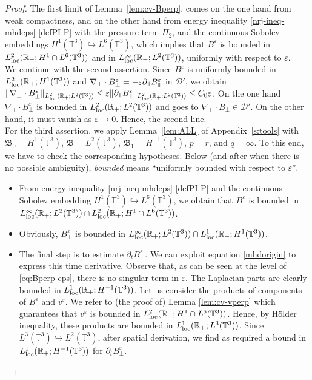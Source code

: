 \documentclass[11pt,reqno]{amsart}
\def \R{{\mathbb{R}}}
\def \T{{\mathbb{T}}}
\newcommand{\myparallel}{{\mkern3mu\vphantom{\perp}\vrule depth 0pt\mkern2mu\vrule depth 0pt\mkern3mu}}
\begin{document}
\begin{proof}
  The first limit of Lemma~\ref{lem:cv-Bperp}, comes on the one hand from weak compactness, and on the other hand from  energy inequality \eqref{nrj-ineq-mhdeps}-\eqref{defPI-P} with the pressure term $\Pi_2$, and the continuous Sobolev embeddings $H^1(\T^3) \hookrightarrow L^6(\T^3)$, which implies that $B^\varepsilon$ is  bounded in $L_{\rm loc}^2(\R_+;  H^1\cap L^6(\T^3)) $ and in $ L_{\rm loc}^\infty(\R_+; L^2(\T^3))$, uniformly with respect to $\varepsilon$.\\
We continue with the second assertion. Since $B^\varepsilon$ is uniformly bounded in $L_{\rm loc}^2(\R_+; H^1(\T^3))$ and $\nabla_\perp \cdot B_\perp^\varepsilon=-\varepsilon \partial_\myparallel B_\myparallel^\varepsilon$ in $\mathcal D'$, we obtain $\|\nabla_\perp \cdot B_\perp^\varepsilon \|_{L_{\rm loc}^2(\R_+; L^2(\T^3))} \leq \varepsilon \|\partial_\myparallel B_\myparallel^\varepsilon \|_{L_{\rm loc}^2(\R_+; L^2(\T^3))} \leq C_0\varepsilon$. On the one hand $ \nabla_\perp \cdot B_\perp^\varepsilon $ is bounded in $ L_{\rm loc}^2(\R_+; L^2(\T^3))$ and goes to $ \nabla_\perp \cdot B_\perp \in \mathcal D'$. On the other hand, it must vanish as $\varepsilon \rightarrow 0$. Hence, the second line.\\
For the third assertion, we apply  Lemma~\ref{lem:ALL} of Appendix~\ref{s:tools} with  $\mathfrak B_0 = H^1(\T^3)$,  $\mathfrak B = L^2(\T^3)$, $\mathfrak B_1 = H^{-1}(\T^3)$,  $p=r$, and $q=\infty$. To this end, we have to check the corresponding hypotheses. Below (and after when there is no possible ambiguity), {\it bounded} means ``uniformly bounded with respect to $\varepsilon$''.
\begin{itemize}
 \item From energy inequality \eqref{nrj-ineq-mhdeps}-\eqref{defPI-P} and the continuous Sobolev embedding $H^1(\T^3) \hookrightarrow L^6(\T^3)$, we obtain that $B^\varepsilon$ is bounded in $L_{\rm loc}^\infty(\R_+; L^2(\T^3)) \cap L_{\rm loc}^2(\R_+;   H^1\cap L^6 (\T^3))$.
  \item Obviously,  $B_\perp^\varepsilon$ is bounded in $L_{\rm loc}^\infty(\R_+; L^2(\T^3))  \cap L_{\rm loc}^1(\R_+; H^1(\T^3)) $.
  \item The final step is to estimate $\partial_t B_\perp^\varepsilon$. We can exploit equation \eqref{mhdorigin} to express this time derivative. Observe that, as can be seen at the level of \eqref{eq:Bperp-eps}, there is no singular term in $ \varepsilon $. The Laplacian parts are clearly bounded in $ L_{\rm loc}^1(\R_+; H^{-1} (\T^3)) $. Let us consider the products of components of $ B^\varepsilon $ and $ v^\varepsilon $. We refer to  (the proof of) Lemma \ref{lem:cv-vperp} which guarantees that $ v^\varepsilon $ is bounded in $L_{\rm loc}^2(\R_+; H^1\cap L^6 (\T^3))$. Hence,
by H\"older inequality, these products are bounded in $ L_{\rm loc}^1(\R_+; L^3 (\T^3)) $. Since $L^3(\T^3) \hookrightarrow L^2(\T^3) $, after spatial derivation, we find as required a bound in $ L_{\rm loc}^1(\R_+; H^{-1} (\T^3)) $ for  $\partial_t B_\perp^\varepsilon$.
\end{itemize}
\end{proof}  
\end{document}

